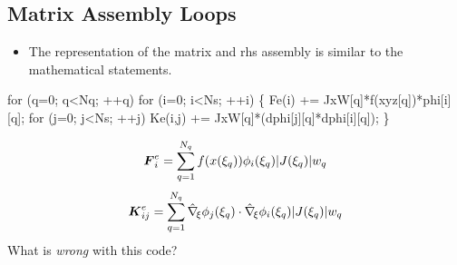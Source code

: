 \subsection*{Matrix Assembly Loops}
\begin{frame}[fragile,t]  
	\begin{block}{}
	  \begin{itemize}    
	  \item{ The \libmesh{} representation of the matrix and
	    rhs assembly is similar to the mathematical statements.
	  }
	  \end{itemize}
	\end{block}
\small
\begin{semiverbatim}
for (q=0; q<Nq; ++q) 
  for (i=0; i<Ns; ++i) \{
    Fe(i)   += JxW[q]*f(xyz[q])*phi[i][q];
    for (j=0; j<Ns; ++j)
      Ke(i,j) += JxW[q]*(dphi[j][q]*dphi[i][q]);
  \}
\end{semiverbatim}
  \begin{equation}
    \nonumber
    {\boldsymbol{F}}^e_{i} = 
    \sum_{q=1}^{N_q}
    f(x(\xi_q))
    \phi_i(\xi_q)
    |J(\xi_q)| w_q
  \end{equation}
  \begin{equation}
  \nonumber
  {\boldsymbol{K}}^e_{ij} =
  \sum_{q=1}^{N_q}
    \hat{\nabla}_{\!\xi} \phi_j(\xi_q) \cdot
    \hat{\nabla}_{\!\xi} \phi_i(\xi_q)
  |J(\xi_q)| w_q
  \end{equation}
\pause
What is \emph{wrong} with this code?
\end{frame}

